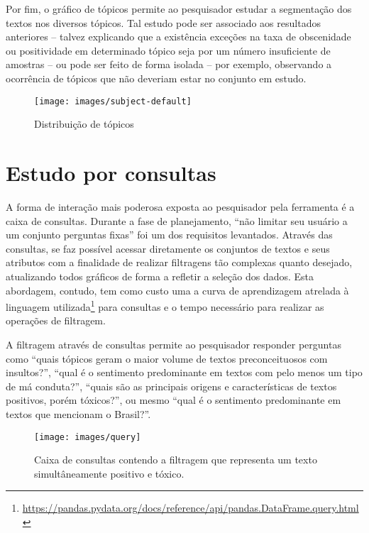 Por fim, o gráfico de tópicos permite ao pesquisador estudar a segmentação dos textos nos diversos tópicos. Tal estudo pode ser associado aos resultados anteriores -- talvez explicando que a existência exceções na taxa de obscenidade ou positividade em determinado tópico seja por um número insuficiente de amostras -- ou pode ser feito de forma isolada -- por exemplo, observando a ocorrência de tópicos que não deveriam estar no conjunto em estudo.

\begin{figure}[hbtp]
    \centering
    \texttt{[image: images/subject-default]}
    \caption{Distribuição de tópicos}
    \label{fig:subject-default}
\end{figure}

\section{Estudo por consultas}

A forma de interação mais poderosa exposta ao pesquisador pela ferramenta é a caixa de consultas. Durante a fase de planejamento, ``não limitar seu usuário a um conjunto perguntas fixas'' foi um dos requisitos levantados. Através das consultas, se faz possível acessar diretamente os conjuntos de textos e seus atributos com a finalidade de realizar filtragens tão complexas quanto desejado, atualizando todos gráficos de forma a refletir a seleção dos dados. Esta abordagem, contudo, tem como custo uma a curva de aprendizagem atrelada à linguagem utilizada\footnote{\url{https://pandas.pydata.org/docs/reference/api/pandas.DataFrame.query.html}\label{url:pandas-query}} para consultas e o tempo necessário para realizar as operações de filtragem.

A filtragem através de consultas permite ao pesquisador responder perguntas como ``quais tópicos geram o maior volume de textos preconceituosos com insultos?'', ``qual é o sentimento predominante em textos com pelo menos um tipo de má conduta?'', ``quais são as principais origens e características de textos positivos, porém tóxicos?'', ou mesmo ``qual é o sentimento predominante em textos que mencionam o Brasil?''.

\begin{figure}[hbtp]
    \centering
    \texttt{[image: images/query]}
    \caption{Caixa de consultas contendo a filtragem que representa um texto simultâneamente positivo e tóxico.}
    \label{fig:query}
\end{figure}

